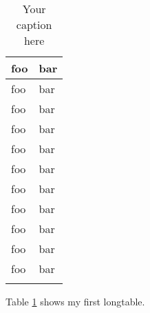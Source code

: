 \documentclass{article}
\begin{document}
\lipsum[1]

\begin{longtable}{| p{} | p{} |} 
\hline
foo & bar \\ \hline 
foo & bar \\ \hline
foo & bar \\ \hline
foo & bar \\ \hline
foo & bar \\ \hline
foo & bar \\ \hline
foo & bar \\ \hline
foo & bar \\ \hline
foo & bar \\ \hline
foo & bar \\ \hline
foo & bar \\ \hline
\caption{Your caption here} %
\label{tab:myfirstlongtable}
\end{longtable}

Table \ref{tab:myfirstlongtable} shows my first longtable.
\end{document}
